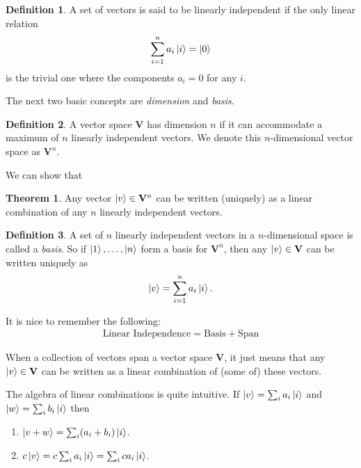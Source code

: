 \documentclass{book}
\theoremstyle{definition}
\newtheorem{defn}{Definition}[section]
\newtheorem{thm}{Theorem}[section]
\newcommand{\V}{\mathbf{V}}
\begin{document}
\begin{defn}
	A set of vectors is said to be linearly independent if the only linear relation 
	\begin{align}
	\sum^n_{i=1}a_i\ket{i} = \ket{0}
	\end{align}
	is the trivial one where the components $a_i = 0$ for any $i$. 
\end{defn}



The next two basic concepts are \textit{dimension} and \textit{basis}. 

\begin{defn}
	A vector space $\V$ has dimension $n$ if it can accommodate a maximum of $n$ linearly independent vectors. We denote this $n$-dimensional vector space as $\V^n$.
\end{defn}

We can show that 

\begin{thm}
	Any vector $\ket{v} \in \V^n$ can be written (uniquely) as a linear combination of any $n$ linearly independent vectors.  
\end{thm}


\begin{defn}
	A set of $n$ linearly independent vectors in a $n$-dimensional space is called a \textit{basis}. So if $\ket{1},\dots,\ket{n}$ form a basis for $\V^n$, then any $\ket{v}\in \V$ can be written uniquely as
	\begin{align}
	\ket{v} = \sum^n_{i=1}a_i\ket{i}.
	\end{align}
\end{defn}

It is nice to remember the following:
\begin{align}
\boxed{\text{Linear Independence} = \text{Basis} + \text{Span}}
\end{align}

When a collection of vectors span a vector space $\V$, it just means that any $\ket{v} \in \V$ can be written as a linear combination of (some of) these vectors. 


The algebra of linear combinations is quite intuitive. If $\ket{v} = \sum_i a_i\ket{i}$ and $\ket{w} = \sum_i b_i\ket{i}$ then 

\begin{enumerate}
	\item $\ket{v + w} = \sum_i (a_i + b_i)\ket{i}$.
	\item $c\ket{v} = c\sum_i a_i\ket{i} = \sum_i ca_i\ket{i}$.
\end{enumerate}
\end{document}
